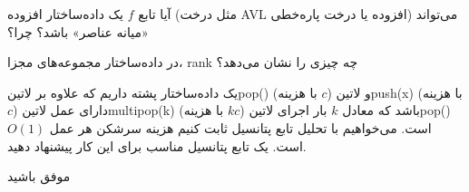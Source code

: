 \documentclass[12pt, a4paper]{article}
\newcommand{\vsp}{\vspace{34pt}}
\newcommand{\پاسخ}[2]{#1}
\begin{document}
\پاسخ{\vsp\vsp}{
	از لحاظ حافظه، درخت پاره‌خطی بهتر است زیرا حافظه آن $O(n)$ و حافظۀ ایدۀ توان‌های ۲ $O(n\log n)$ است. از لحاظ زمانِ پاسخ به پرسش، ایدۀ توان‌های ۲ بهتر است زیرا به هر پرسش در $O(1)$ پاسخ می‌دهد و درخت پاره‌خطی در $O(\log n)$. از لحاظ قابلیت تغییر یکی از اعضای آرایه، درخت پاره‌خطی این امکان را دارد ولی ایده توان‌های ۲ این قابلیت را ندارد. برای نمره‌دهی، نوشتن دلایل نیاز نیست و ذکر داده‌ساختار مناسب‌تر از هر دید کفایت می‌کند.
	
}

آیا تابع $f$ یک داده‌ساختار افزوده (مثل درخت AVL افزوده یا درخت پاره‌خطی) می‌تواند «میانه عناصر» باشد؟ چرا؟

\پاسخ{\vsp\vsp}{
	خیر. زیرا مقدار $f$ یک رأس را نمی‌توان از مقادیر $f$ دو فرزند آن به دست آورد.
	
}

در داده‌ساختار مجموعه‌های مجزا، rank چه چیزی را نشان می‌دهد؟

\پاسخ{\vsp\vsp}{
	rank
	همان ارتفاع است در حالتی که فشرده‌سازی مسیر نداشته باشیم. به عبارت دیگر rank حداکثر ارتفاع ممکن زیردرخت است.
	
}

یک داده‌ساختار پشته داریم که علاوه بر ‌لاتین{pop()} (با هزینه $c$) و ‌لاتین{push(x)} (با هزینه $c$) دارای عمل ‌لاتین{multipop(k)} (با هزینه $kc$) باشد که معادل $k$ بار اجرای ‌لاتین{pop()} است. می‌خواهیم با تحلیل تابع پتانسیل ثابت کنیم هزینه سرشکن هر عمل $O(1)$ است. یک تابع پتانسیل مناسب برای این کار پیشنهاد دهید.

\پاسخ{\vsp\vsp}{
تعداد اعضای پشته ضرب در $c$. در صورتی که ضرب در $c$ لحاظ نشود، نیمی از نمره داده می‌شود.
	
}
\vspace{1pt}
\begin{flushleft}
موفق باشید
\end{flushleft}
\end{document}
